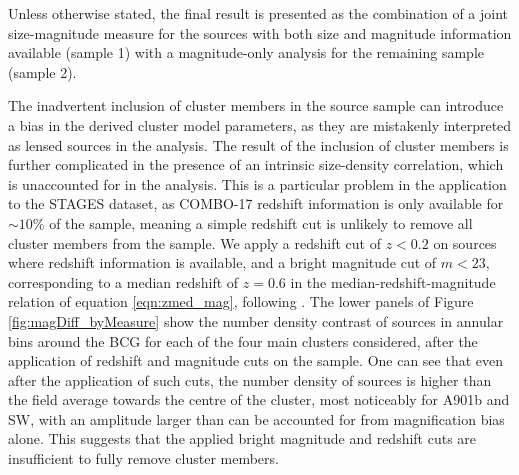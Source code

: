 \documentclass[useAMS,usenatbib,times,letter,amssymb]{mn2e}
\begin{document}
Unless otherwise stated, the final result is presented as the combination of a joint size-magnitude measure for the sources with both size and magnitude information available (sample 1) with a magnitude-only analysis for the remaining sample (sample 2). 

The inadvertent inclusion of cluster members in the source sample can introduce a bias in the derived cluster model parameters, as they are mistakenly interpreted as lensed sources in the analysis. The result of the inclusion of cluster members is further complicated in the presence of an intrinsic size-density correlation, which is unaccounted for in the analysis. This is a particular problem in the application to the STAGES dataset, as COMBO-17 redshift information is only available for $\sim 10\%$ of the sample, meaning a simple redshift cut is unlikely to remove all cluster members from the sample. We apply a redshift cut of $z<0.2$ on sources where redshift information is available, and a bright magnitude cut of $m<23$, corresponding to a median redshift of $z=0.6$ in the median-redshift-magnitude relation of equation \ref{eqn:zmed_mag}, following \cite{Heymans:2008p2060}. The lower panels of Figure \ref{fig:magDiff_byMeasure} show the number density contrast of sources in annular bins around the BCG for each of the four main clusters considered, after the application of redshift and magnitude cuts on the sample. One can see that even after the application of such cuts, the number density of sources is higher than the field average towards the centre of the cluster, most noticeably for A901b and SW, with an amplitude larger than can be accounted for from magnification bias alone.  This suggests that the applied bright magnitude and redshift cuts are insufficient to fully remove cluster members. 
\end{document}
